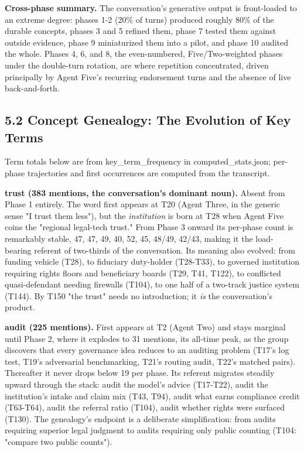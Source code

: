 \documentclass[sigconf,nonacm=true]{acmart}
\begin{document}
\textbf{Cross-phase summary.} The conversation's generative output is front-loaded to an extreme degree: phases 1-2 (20\% of turns) produced roughly 80\% of the durable concepts, phases 3 and 5 refined them, phase 7 tested them against outside evidence, phase 9 miniaturized them into a pilot, and phase 10 audited the whole. Phases 4, 6, and 8,  the even-numbered, Five/Two-weighted phases under the double-turn rotation,  are where repetition concentrated, driven principally by Agent Five's recurring endorsement turns and the absence of live back-and-forth.

\subsection{5.2 Concept Genealogy: The Evolution of Key Terms}

Term totals below are from key\_term\_frequency in computed\_stats.json; per-phase trajectories and first occurrences are computed from the transcript.

\textbf{trust (383 mentions,  the conversation's dominant noun).} Absent from Phase 1 entirely. The word first appears at T20 (Agent Three, in the generic sense "I trust them less"), but the \textit{institution} is born at T28 when Agent Five coins the "regional legal-tech trust." From Phase 3 onward its per-phase count is remarkably stable,  47, 47, 49, 40, 52, 45, 48/49, 42/43,  making it the load-bearing referent of two-thirds of the conversation. Its meaning also evolved: from funding vehicle (T28), to fiduciary duty-holder (T28-T33), to governed institution requiring rights floors and beneficiary boards (T29, T41, T122), to conflicted quasi-defendant needing firewalls (T104), to one half of a two-track justice system (T144). By T150 "the trust" needs no introduction; it \textit{is} the conversation's product.

\textbf{audit (225 mentions).} First appears at T2 (Agent Two) and stays marginal until Phase 2, where it explodes to 31 mentions,  its all-time peak,  as the group discovers that every governance idea reduces to an auditing problem (T17's log test, T19's adversarial benchmarking, T21's routing audit, T22's matched pairs). Thereafter it never drops below 19 per phase. Its referent migrates steadily upward through the stack: audit the model's advice (T17-T22), audit the institution's intake and claim mix (T43, T94), audit what earns compliance credit (T63-T64), audit the referral ratio (T104), audit whether rights were surfaced (T130). The genealogy's endpoint is a deliberate simplification: from audits requiring superior legal judgment to audits requiring only public counting (T104: "compare two public counts").
\end{document}

